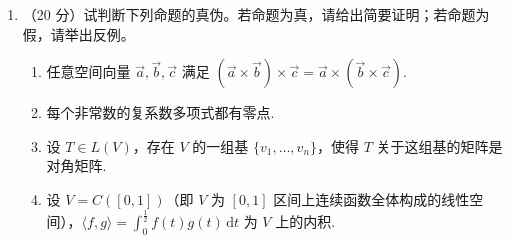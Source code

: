 \begin{enumerate}
    \begin{enumerate}
        \item $C=XX^\mathrm{T}$;
        \item 取 $\lambda_1\geqslant\cdots\geqslant\lambda_k$ 为 $C$ 最大的 $k$ 个特征值，$v_1,\ldots,v_k$ 为对应的单位特征向量;
        \item 令 $V=\spa(v_1,\ldots,v_k)$，$U=(v_1,\ldots,v_k)$，$P_V=UU^\mathrm{T}$;
        \item 令 $y_i=P_V x_i$，$i=1,\ldots,n$.
    \end{enumerate}
    证明：
    \begin{enumerate}
        \item $\{v_1,\ldots,v_k\}$ 为 $V$ 的规范正交基，且 $P_V$ 为 $\mathbf{R}^n$ 到 $V$ 的正交投影.
        \item PCA 算法最小化投影误差. 即 $\forall W$ 为 $\mathbf{R}^n$ 的 $k$ 维子空间，$P_W$ 为正交投影， $\displaystyle\sum_{i=1}^p \|x_i-y_i\|^2 \leqslant \displaystyle\sum_{i=1}^p \|x_i-P_W x_i\|^2$.
    \end{enumerate}
    \item （20 分）试判断下列命题的真伪。若命题为真，请给出简要证明；若命题为假，请举出反例。
    \begin{enumerate}
        \item 任意空间向量 $\vec{a}, \vec{b}, \vec{c}$ 满足 $(\vec{a}\times\vec{b})\times\vec{c} = \vec{a}\times(\vec{b}\times\vec{c})$.
        \item 每个非常数的复系数多项式都有零点.
        \item 设 $T \in L(V)$，存在 $V$ 的一组基 $\{v_1, \ldots, v_n\}$，使得 $T$ 关于这组基的矩阵是对角矩阵.
        \item 设 $V = C([0,1])$（即 $V$ 为 $[0,1]$ 区间上连续函数全体构成的线性空间），$\langle f, g \rangle = \displaystyle\int_0^{\frac{1}{2}} f(t)g(t)\,\mathrm{d}t$ 为 $V$ 上的内积.
    \end{enumerate}
\end{enumerate}

\clearpage
